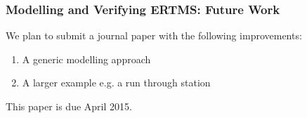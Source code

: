 \documentclass{beamer}
\begin{document}
\begin{frame}
\frametitle{Modelling and Verifying ERTMS: Future Work}
We plan to submit a journal paper with the following improvements:
\begin{enumerate}
\item A generic modelling approach

\item A larger example e.g. a run through station

\end{enumerate}
\medskip
This paper is due April 2015.

\end{frame}
\end{document}
